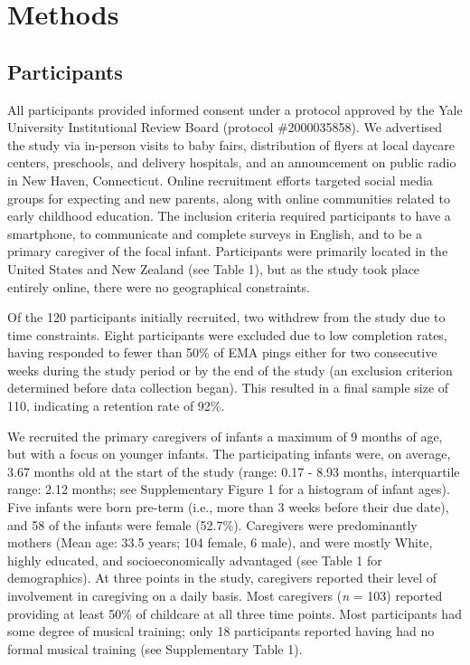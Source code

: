 \documentclass[
]{article}
\begin{document}
\section{Methods}\label{methods}

\subsection{Participants}\label{participants}

All participants provided informed consent under a protocol approved by
the Yale University Institutional Review Board (protocol \#2000035858).
We advertised the study via in-person visits to baby fairs, distribution
of flyers at local daycare centers, preschools, and delivery hospitals,
and an announcement on public radio in New Haven, Connecticut. Online
recruitment efforts targeted social media groups for expecting and new
parents, along with online communities related to early childhood
education. The inclusion criteria required participants to have a
smartphone, to communicate and complete surveys in English, and to be a
primary caregiver of the focal infant. Participants were primarily
located in the United States and New Zealand (see Table 1), but as the
study took place entirely online, there were no geographical
constraints.

Of the 120 participants initially recruited, two withdrew from the study
due to time constraints. Eight participants were excluded due to low
completion rates, having responded to fewer than 50\% of EMA pings
either for two consecutive weeks during the study period or by the end
of the study (an exclusion criterion determined before data collection
began). This resulted in a final sample size of 110, indicating a
retention rate of 92\%.

We recruited the primary caregivers of infants a maximum of 9 months of
age, but with a focus on younger infants. The participating infants
were, on average, 3.67 months old at the start of the study (range: 0.17
- 8.93 months, interquartile range: 2.12 months; see Supplementary
Figure 1 for a histogram of infant ages). Five infants were born
pre-term (i.e., more than 3 weeks before their due date), and 58 of the
infants were female (52.7\%). Caregivers were predominantly mothers
(Mean age: 33.5 years; 104 female, 6 male), and were mostly White,
highly educated, and socioeconomically advantaged (see Table 1 for
demographics). At three points in the study, caregivers reported their
level of involvement in caregiving on a daily basis. Most caregivers
(\emph{n} = 103) reported providing at least 50\% of childcare at all
three time points. Most participants had some degree of musical
training; only 18 participants reported having had no formal musical
training (see Supplementary Table 1).
\end{document}

